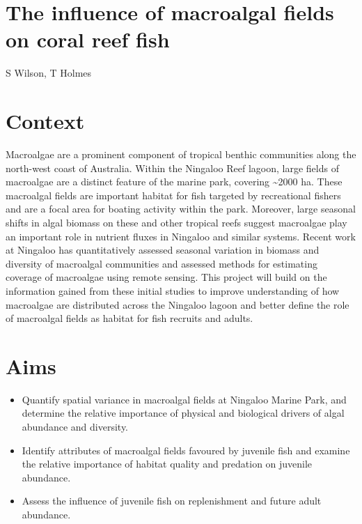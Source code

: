 \documentclass[version=last,
    paper=a4, %
    10pt, %
    usenames,
    dvipsnames,
    oneside, %
    headings=openany, %
    DIV=15 %
]{scrbook}
\begin{document}
\section*{The influence of macroalgal fields on coral reef fish
}

S Wilson, T Holmes


\section*{Context}
Macroalgae are a prominent component of tropical benthic communities
along the north-west coast of Australia. Within the Ningaloo Reef
lagoon, large fields of macroalgae are a distinct feature of the marine
park, covering \textasciitilde{}2000 ha. These macroalgal fields are
important habitat for fish targeted by recreational fishers and are a
focal area for boating activity within the park. Moreover, large
seasonal shifts in algal biomass on these and other tropical reefs
suggest macroalgae play an important role in nutrient fluxes in Ningaloo
and similar systems. Recent work at Ningaloo has quantitatively assessed
seasonal variation in biomass and diversity of macroalgal communities
and assessed methods for estimating coverage of macroalgae using remote
sensing. This project will build on the information gained from these
initial studies to improve understanding of how macroalgae are
distributed across the Ningaloo lagoon and better define the role of
macroalgal fields as habitat for fish recruits and adults.



\section*{Aims}
\begin{itemize}
\itemsep1pt\parskip0pt
\item
  Quantify spatial variance in macroalgal fields at Ningaloo Marine
  Park, and determine the relative importance of physical and biological
  drivers of algal abundance and diversity.
\item
  Identify attributes of macroalgal fields favoured by juvenile fish and
  examine the relative importance of habitat quality and predation on
  juvenile abundance.
\item
  Assess the influence of juvenile fish on replenishment and future
  adult abundance.
\end{itemize}
\end{document}
